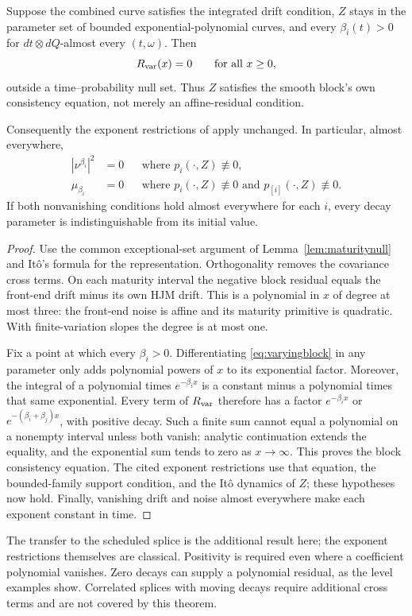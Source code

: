 \begin{theorem}\label{thm:varyingexponents}
Suppose the combined curve satisfies the integrated drift condition, $Z$ stays in the parameter set of bounded exponential-polynomial curves, and every $\beta_i(t)>0$ for $dt\otimes dQ$-almost every $(t,\omega)$. Then
\[
R_{\rm var}(x)=0\qquad\text{for all }x\ge0,
\]
outside a time--probability null set. Thus $Z$ satisfies the smooth block's own consistency equation, not merely an affine-residual condition.

Consequently the exponent restrictions of \citet{filipovic2000exponential} apply unchanged. In particular, almost everywhere,
\begin{align*}
|\nu^{\beta_i}|^2&=0&&\text{where }p_i(\cdot,Z)\not\equiv0,\\
\mu_{\beta_i}&=0&&\text{where }p_i(\cdot,Z)\not\equiv0
                    \text{ and }p_{[i]}(\cdot,Z)\not\equiv0.
\end{align*}
If both nonvanishing conditions hold almost everywhere for each $i$, every decay parameter is indistinguishable from its initial value.
\end{theorem}
\begin{proof}
Use the common exceptional-set argument of Lemma~\ref{lem:maturitynull} and It\^o's formula for the representation. Orthogonality removes the covariance cross terms. On each maturity interval the negative block residual equals the front-end drift minus its own HJM drift. This is a polynomial in $x$ of degree at most three: the front-end noise is affine and its maturity primitive is quadratic. With finite-variation slopes the degree is at most one.

Fix a point at which every $\beta_i>0$. Differentiating \eqref{eq:varyingblock} in any parameter only adds polynomial powers of $x$ to its exponential factor. Moreover, the integral of a polynomial times $e^{-\beta_i x}$ is a constant minus a polynomial times that same exponential. Every term of $R_{\rm var}$ therefore has a factor $e^{-\beta_i x}$ or $e^{-(\beta_i+\beta_j)x}$, with positive decay. Such a finite sum cannot equal a polynomial on a nonempty interval unless both vanish: analytic continuation extends the equality, and the exponential sum tends to zero as $x\to\infty$. This proves the block consistency equation. The cited exponent restrictions use that equation, the bounded-family support condition, and the It\^o dynamics of $Z$; these hypotheses now hold. Finally, vanishing drift and noise almost everywhere make each exponent constant in time.
\end{proof}

The transfer to the scheduled splice is the additional result here; the exponent restrictions themselves are classical. Positivity is required even where a coefficient polynomial vanishes. Zero decays can supply a polynomial residual, as the level examples show. Correlated splices with moving decays require additional cross terms and are not covered by this theorem.
